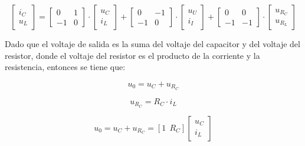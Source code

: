 \vspace{-0.5cm}
\begin{equation}
    \begin{bmatrix}
        i_C \\
        u_L
    \end{bmatrix}
    =
    \begin{bmatrix}
        0 & 1 \\
        -1 & 0
    \end{bmatrix}
    \cdot
    \begin{bmatrix}
        u_C \\
        i_L
    \end{bmatrix}
    +
    \begin{bmatrix}
        0 & -1 \\
        -1 & 0
    \end{bmatrix}
    \cdot
    \begin{bmatrix}
        u_U \\
        i_I
    \end{bmatrix}
    +
    \begin{bmatrix}
        0 & 0 \\
        -1 & -1
    \end{bmatrix}
    \cdot
    \begin{bmatrix}
        u_{R_C} \\
        u_{R_L}
    \end{bmatrix}
\end{equation}

Dado que el voltaje de salida es la suma del voltaje del capacitor y del voltaje del resistor, 
donde el voltaje del resistor es el producto de la corriente y la resistencia, entonces se tiene que:

\vspace{-0.75cm}
\begin{equation}
    u_0 = u_C + u_{R_C}
\end{equation}
\vspace{-0.75cm}

\vspace{-0.75cm}
\begin{equation}
    u_{R_C} = R_C \cdot i_L
\end{equation}
\vspace{-0.75cm}

\vspace{-0.75cm}
\begin{equation}
    u_0 = u_C + u_{R_C} = [1 \ \ R_C] 
    \begin{bmatrix}
        u_C \\
        i_L
    \end{bmatrix}
\end{equation}
\vspace{-0.5cm}

